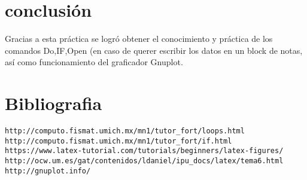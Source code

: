 \documentclass{article}
\begin{document}
\section{conclusión}
Gracias a esta práctica se logró obtener el conocimiento y práctica de los comandos Do,IF,Open (en caso de querer escribir los datos en un block de notas, así como funcionamiento del graficador Gnuplot.

\section{Bibliografia}
\begin{verbatim}
http://computo.fismat.umich.mx/mn1/tutor_fort/loops.html
http://computo.fismat.umich.mx/mn1/tutor_fort/if.html
https://www.latex-tutorial.com/tutorials/beginners/latex-figures/
http://ocw.um.es/gat/contenidos/ldaniel/ipu_docs/latex/tema6.html
http://gnuplot.info/
\end{verbatim}
\end{document}
